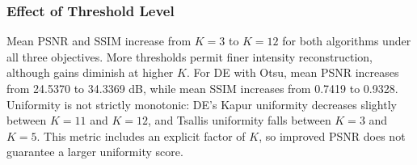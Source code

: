 \documentclass[review]{elsarticle}
\begin{document}
\begin{table}[htbp]
\centering
\small
\caption{SSIM on BSD500 using Tsallis ($q=0.8$): pooled mean $\pm$ sample standard deviation across 300 observations per entry (10 images, 30 runs each).}
\label{tab:bsd-tsallis-ssim}
\end{table}

\begin{table}[htbp]
\centering
\small
\caption{Uniformity on BSD500 using Tsallis ($q=0.8$): pooled mean $\pm$ sample standard deviation across 300 observations per entry (10 images, 30 runs each).}
\label{tab:bsd-tsallis-uniformity}
\end{table}

\clearpage

\subsubsection{Effect of Threshold Level}

Mean PSNR and SSIM increase from $K=3$ to $K=12$ for both algorithms under all three objectives. More thresholds permit finer intensity reconstruction, although gains diminish at higher $K$. For DE with Otsu, mean PSNR increases from 24.5370 to 34.3369 dB, while mean SSIM increases from 0.7419 to 0.9328. Uniformity is not strictly monotonic: DE's Kapur uniformity decreases slightly between $K=11$ and $K=12$, and Tsallis uniformity falls between $K=3$ and $K=5$. This metric includes an explicit factor of $K$, so improved PSNR does not guarantee a larger uniformity score.
\end{document}
